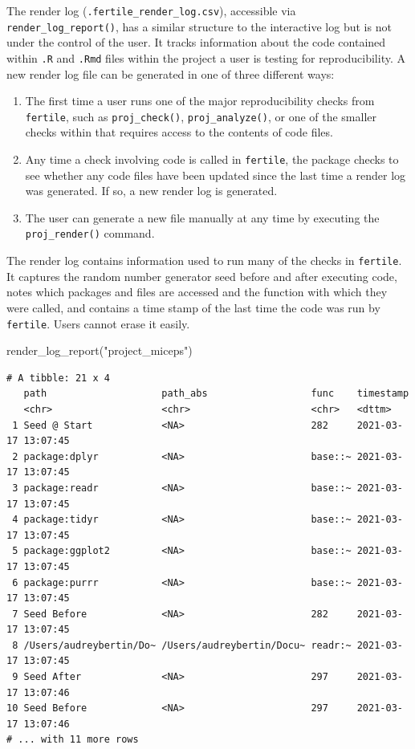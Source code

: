 \documentclass[12pt,twoside]{reedthesis}
\newenvironment{Shaded}{\begin{snugshade}}{\end{snugshade}}
\newcommand{\FunctionTok}[1]{\textcolor[rgb]{0.00,0.00,0.00}{#1}}
\newcommand{\NormalTok}[1]{#1}
\newcommand{\StringTok}[1]{\textcolor[rgb]{0.31,0.60,0.02}{#1}}
\begin{document}
The render log (\texttt{.fertile\_render\_log.csv}), accessible via \texttt{render\_log\_report()}, has a similar structure to the interactive log but is not under the control of the user. It tracks information about the code contained within \texttt{.R} and \texttt{.Rmd} files within the project a user is testing for reproducibility. A new render log file can be generated in one of three different ways:
\begin{enumerate}
\def\labelenumi{\arabic{enumi}.}
\item
  The first time a user runs one of the major reproducibility checks from \texttt{fertile}, such as \texttt{proj\_check()}, \texttt{proj\_analyze()}, or one of the smaller checks within that requires access to the contents of code files.
\item
  Any time a check involving code is called in \texttt{fertile}, the package checks to see whether any code files have been updated since the last time a render log was generated. If so, a new render log is generated.
\item
  The user can generate a new file manually at any time by executing the \texttt{proj\_render()} command.
\end{enumerate}
The render log contains information used to run many of the checks in \texttt{fertile}. It captures the random number generator seed before and after executing code, notes which packages and files are accessed and the function with which they were called, and contains a time stamp of the last time the code was run by \texttt{fertile}. Users cannot erase it easily.
\begin{Shaded}
\begin{Highlighting}[]
\FunctionTok{render\_log\_report}\NormalTok{(}\StringTok{"project\_miceps"}\NormalTok{)}
\end{Highlighting}
\end{Shaded}
\footnotesize
\begin{verbatim}
# A tibble: 21 x 4
   path                    path_abs                  func    timestamp          
   <chr>                   <chr>                     <chr>   <dttm>             
 1 Seed @ Start            <NA>                      282     2021-03-17 13:07:45
 2 package:dplyr           <NA>                      base::~ 2021-03-17 13:07:45
 3 package:readr           <NA>                      base::~ 2021-03-17 13:07:45
 4 package:tidyr           <NA>                      base::~ 2021-03-17 13:07:45
 5 package:ggplot2         <NA>                      base::~ 2021-03-17 13:07:45
 6 package:purrr           <NA>                      base::~ 2021-03-17 13:07:45
 7 Seed Before             <NA>                      282     2021-03-17 13:07:45
 8 /Users/audreybertin/Do~ /Users/audreybertin/Docu~ readr:~ 2021-03-17 13:07:45
 9 Seed After              <NA>                      297     2021-03-17 13:07:46
10 Seed Before             <NA>                      297     2021-03-17 13:07:46
# ... with 11 more rows
\end{verbatim}
\normalsize
\end{document}
